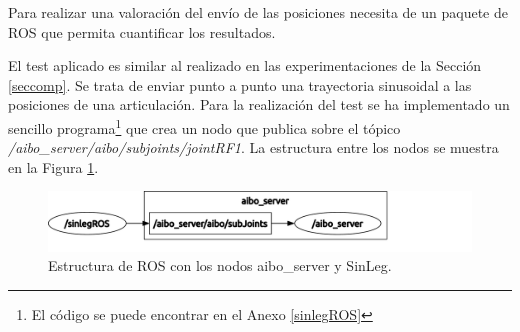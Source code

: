 \documentclass[12pt,a4paper,final,twoside]{book}
\begin{document}
Para realizar una valoración del envío de las posiciones necesita de un paquete de ROS que permita cuantificar los resultados.

El test aplicado es similar al realizado en las experimentaciones de la Sección \ref{seccomp}. Se trata de enviar punto a punto una trayectoria sinusoidal a las posiciones de una articulación.
Para la realización del test se ha implementado un sencillo programa\footnote{El código se puede encontrar en el Anexo \ref{sinlegROS}} que crea un nodo que publica sobre el tópico \textit{/aibo{\_}server/aibo/subjoints/jointRF1}.
La estructura entre los nodos se muestra en la Figura \ref{fig:ASSL}.
\begin{figure}[H]
	\centering
    \includegraphics[scale=0.35]{images/rosgraphASsin.pdf}
	 \caption{Estructura de ROS con los nodos aibo\_server y SinLeg.}
  \label{fig:ASSL}
\end{figure}
\end{document}
